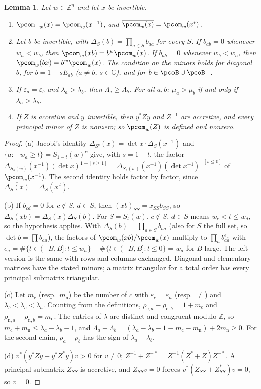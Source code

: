 \documentclass[10pt]{amsart}
\newtheorem{lemma}[theorem]{Lemma}
\theoremstyle{definition}
\theoremstyle{remark}
\newcommand{\C}{\mathbb C}
\newcommand{\Z}{\mathbb Z}
\begin{document}
\begin{lemma}\label{pco:minors}
Let $w\in\Z^n$ and let $x$ be invertible.
\begin{enumerate}
\item[(a)] $\pcom_{-w}(x)=\pcom_w(x^{-1})$, and $\overline{\pcom_w(x)}=\pcom_w(x^*)$.
\item[(b)] Let $b$ be invertible, with $\Delta_S(b)=\prod_{a\in S}b_{aa}$ for every $S$. If
$b_{ab}=0$ whenever $w_a<w_b$, then $\pcom_w(xb)=b^w\pcom_w(x)$. If $b_{ab}=0$ whenever
$w_b<w_a$, then $\pcom_w(bx)=b^w\pcom_w(x)$. The condition on the minors holds for diagonal $b$,
for $b=1+sE_{ab}$ \textup($a\ne b$, $s\in\C$\textup), and for $b\in\pcoB\cup\pcoB^-$.
\item[(c)] If $\varepsilon_a=\varepsilon_b$ and $\lambda_a>\lambda_b$, then $\Lambda_a\ge\Lambda_b$.
For all $a,b$: $\mu_a>\mu_b$ if and only if $\lambda_a>\lambda_b$.
\item[(d)] If $Z$ is accretive and $y$ invertible, then $y^*Zy$ and $Z^{-1}$ are accretive, and
every principal minor of $Z$ is nonzero; so $\pcom_w(Z)$ is defined and nonzero.
\end{enumerate}
\end{lemma}
\begin{proof}
(a) Jacobi's identity $\Delta_{S^c}(x)=\det x\cdot\Delta_S(x^{-1})$ and
$\{a:-w_a\ge t\}=S_{1-t}(w)^c$ give, with $s=1-t$, the factor $\Delta_{S_s(w)}(x^{-1})
(\det x)^{1-[s\ge1]}=\Delta_{S_s(w)}(x^{-1})(\det x^{-1})^{-[s\le0]}$ of $\pcom_w(x^{-1})$. The
second identity holds factor by factor, since $\overline{\Delta_S(x)}=\Delta_S(\bar x^{\,t})$.

(b) If $b_{cd}=0$ for $c\notin S$, $d\in S$, then $(xb)_{SS}=x_{SS}b_{SS}$, so $\Delta_S(xb)=
\Delta_S(x)\Delta_S(b)$. For $S=S_t(w)$, $c\notin S$, $d\in S$ means $w_c<t\le w_d$, so the
hypothesis applies. With $\Delta_S(b)=\prod_{a\in S}b_{aa}$ (also for $S$ the full set, so
$\det b=\prod b_{aa}$), the factors of $\pcom_w(xb)/\pcom_w(x)$ multiply to $\prod_ab_{aa}^{e_a}$
with $e_a=\#\{t\in(-B,B]:t\le w_a\}-\#\{t\in(-B,B]:t\le0\}=w_a$ for $B$ large. The left version
is the same with rows and columns exchanged. Diagonal and elementary matrices have the stated
minors; a matrix triangular for a total order has every principal submatrix triangular.

(c) Let $m_{\mathrm c}$ (resp.\ $m_{\mathrm n}$) be the number of $c$ with $\varepsilon_c=
\varepsilon_a$ (resp.\ $\ne$) and $\lambda_b<\lambda_c<\lambda_a$. Counting from the definitions,
$\rho_{\mathrm c,a}-\rho_{\mathrm c,b}=1+m_{\mathrm c}$ and $\rho_{\mathrm n,a}-
\rho_{\mathrm n,b}=m_{\mathrm n}$. The entries of $\lambda$ are distinct and congruent modulo $\Z$,
so $m_{\mathrm c}+m_{\mathrm n}\le\lambda_a-\lambda_b-1$, and $\Lambda_a-\Lambda_b=
(\lambda_a-\lambda_b-1-m_{\mathrm c}-m_{\mathrm n})+2m_{\mathrm n}\ge0$. For the second claim,
$\rho_a-\rho_b$ has the sign of $\lambda_a-\lambda_b$.

(d) $v^*(y^*Zy+y^*Z^*y)v>0$ for $v\ne0$; $Z^{-1}+Z^{-*}=Z^{-1}(Z^*+Z)Z^{-*}$. A principal submatrix
$Z_{SS}$ is accretive, and $Z_{SS}v=0$ forces $v^*(Z_{SS}+Z_{SS}^*)v=0$, so $v=0$.
\end{proof}
\end{document}
